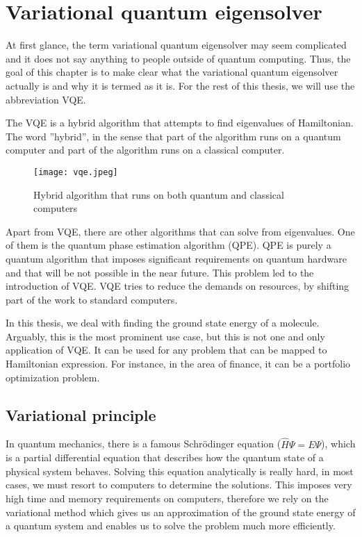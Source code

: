 \chapter{Variational quantum eigensolver}\label{ch:vqe}
At first glance, the term variational quantum eigensolver may seem complicated and it does not say anything to people outside of quantum computing. Thus, the goal of this chapter is to make clear what the variational quantum eigensolver actually is and why it is termed as it is. For the rest of this thesis, we will use the abbreviation VQE.

The VQE is a hybrid algorithm that attempts to find eigenvalues of Hamiltonian. The word ''hybrid'',  in the sense that part of the algorithm runs on a quantum computer and part of the algorithm runs on a classical computer.

\begin{figure}[H]
    \centering
    \texttt{[image: vqe.jpeg]}
    \caption{Hybrid algorithm that runs on both quantum and classical computers~\cite{hybrid_alg}}
\end{figure}

Apart from VQE, there are other algorithms that can solve from eigenvalues. One of them is the quantum phase estimation algorithm (QPE). QPE is purely a quantum algorithm that imposes significant requirements on quantum hardware and that will be not possible in the near future. This problem led to the introduction of VQE. VQE tries to reduce the demands on resources, by shifting part of the work to standard computers.~\cite{fedorov2021vqe}

In this thesis, we deal with finding the ground state energy of a molecule. Arguably, this is the most prominent use case, but this is not one and only application of VQE. It can be used for any problem that can be mapped to Hamiltonian expression. For instance, in the area of finance, it can be a portfolio optimization problem.

\section{Variational principle}
In quantum mechanics, there is a famous Schrödinger equation ($\hat{H} \Psi = E \Psi$), which is a partial differential equation that describes how the quantum state of a physical system behaves. Solving this equation analytically  is really hard, in most cases, we must resort to computers to determine the solutions. This imposes very high time and memory requirements on computers, therefore we rely on the variational method which gives us an approximation of the ground state energy of a quantum system and enables us to solve the problem much more efficiently.~\cite{Thijssen_2007}

